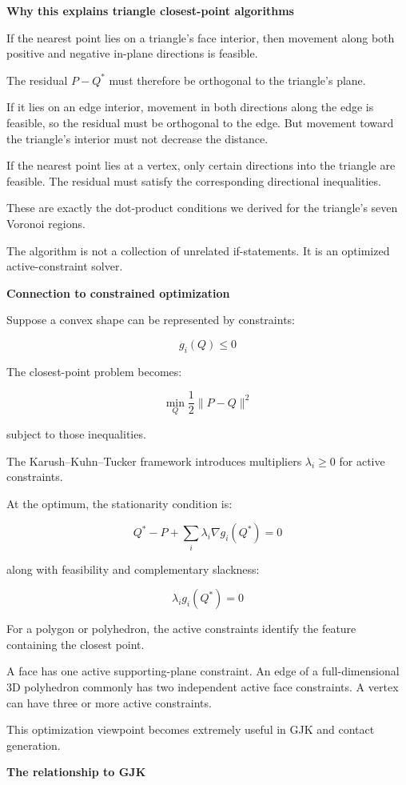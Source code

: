 \textbf{Why this explains triangle closest-point algorithms}

If the nearest point lies on a triangle's face interior, then movement along both positive and negative in-plane directions is feasible.

The residual \(P-Q^*\) must therefore be orthogonal to the triangle's plane.

If it lies on an edge interior, movement in both directions along the edge is feasible, so the residual must be orthogonal to the edge. But movement toward the triangle's interior must not decrease the distance.

If the nearest point lies at a vertex, only certain directions into the triangle are feasible. The residual must satisfy the corresponding directional inequalities.

These are exactly the dot-product conditions we derived for the triangle's seven Voronoi regions.

The algorithm is not a collection of unrelated if-statements. It is an optimized active-constraint solver.

\textbf{Connection to constrained optimization}

Suppose a convex shape can be represented by constraints:

\[
g_i(Q)\le0
\]

The closest-point problem becomes:

\[
\min_Q \frac12\|P-Q\|^2
\]

subject to those inequalities.

The Karush--Kuhn--Tucker framework introduces multipliers \(\lambda_i\ge0\) for active constraints.

At the optimum, the stationarity condition is:

\[
Q^*-P+\sum_i\lambda_i\nabla g_i(Q^*)=0
\]

along with feasibility and complementary slackness:

\[
\lambda_i g_i(Q^*)=0
\]

For a polygon or polyhedron, the active constraints identify the feature containing the closest point.

A face has one active supporting-plane constraint. An edge of a full-dimensional 3D polyhedron commonly has two independent active face constraints. A vertex can have three or more active constraints.

This optimization viewpoint becomes extremely useful in GJK and contact generation.

\textbf{The relationship to GJK}


